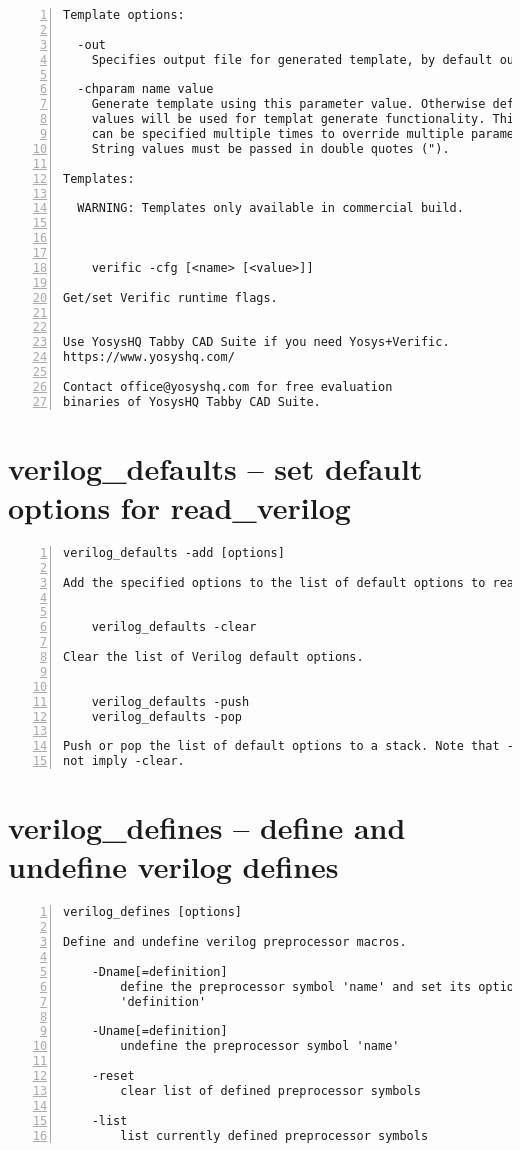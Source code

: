 \begin{lstlisting}[numbers=left,frame=single]
Template options:

  -out
    Specifies output file for generated template, by default output is stdout

  -chparam name value 
    Generate template using this parameter value. Otherwise default parameter
    values will be used for templat generate functionality. This option
    can be specified multiple times to override multiple parameters.
    String values must be passed in double quotes (").

Templates:

  WARNING: Templates only available in commercial build.



    verific -cfg [<name> [<value>]]

Get/set Verific runtime flags.


Use YosysHQ Tabby CAD Suite if you need Yosys+Verific.
https://www.yosyshq.com/

Contact office@yosyshq.com for free evaluation
binaries of YosysHQ Tabby CAD Suite.
\end{lstlisting}

\section{verilog\_defaults -- set default options for read\_verilog}
\label{cmd:verilog_defaults}
\begin{lstlisting}[numbers=left,frame=single]
    verilog_defaults -add [options]

Add the specified options to the list of default options to read_verilog.


    verilog_defaults -clear

Clear the list of Verilog default options.


    verilog_defaults -push
    verilog_defaults -pop

Push or pop the list of default options to a stack. Note that -push does
not imply -clear.
\end{lstlisting}

\section{verilog\_defines -- define and undefine verilog defines}
\label{cmd:verilog_defines}
\begin{lstlisting}[numbers=left,frame=single]
    verilog_defines [options]

Define and undefine verilog preprocessor macros.

    -Dname[=definition]
        define the preprocessor symbol 'name' and set its optional value
        'definition'

    -Uname[=definition]
        undefine the preprocessor symbol 'name'

    -reset
        clear list of defined preprocessor symbols

    -list
        list currently defined preprocessor symbols
\end{lstlisting}

